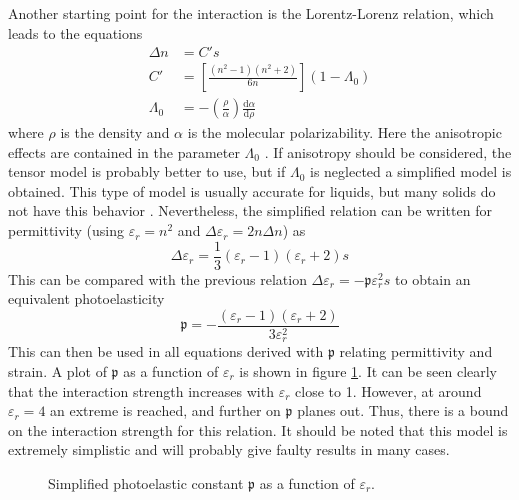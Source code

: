 \documentclass[10pt,a4paper]{eitExjobb}
\begin{document}
	Another starting point for the interaction is the Lorentz-Lorenz relation, which leads to the equations \cite{Korpel1988}
	\begin{align*}
	\Delta n &= C' s \\
	C' &= \left[ \frac{(n^2-1)(n^2+2)}{6n} \right](1-\Lambda_0) \\
	\Lambda_0 &= -\left( \frac{\rho}{\alpha} \right) \frac{\mathrm{d} \alpha}{\mathrm{d} \rho}
	\end{align*}
	where $\rho$ is the density and $\alpha$ is the molecular polarizability. Here the anisotropic effects are contained in the parameter $\Lambda_0$ \cite{Korpel1988}. If anisotropy should be considered, the tensor model is probably better to use, but if $\Lambda_0$ is neglected a simplified model is obtained. This type of model is usually accurate for liquids, but many solids do not have this behavior \cite{Korpel1988}. Nevertheless, the simplified relation can be written for permittivity (using $\varepsilon_r = n^2$ and $\Delta \varepsilon_r = 2n \Delta n$) as
	\begin{equation*}
	\Delta \varepsilon_r = \frac{1}{3} (\varepsilon_r - 1)(\varepsilon_r + 2) s
	\end{equation*}
	This can be compared with the previous relation $\Delta \varepsilon_r = -\mathfrak{p}\varepsilon_r^2 s$ to obtain an equivalent photoelasticity
	\begin{equation*}
	\mathfrak{p} = -\frac{(\varepsilon_r - 1)(\varepsilon_r + 2)}{3\varepsilon_r^2}
	\end{equation*}
	This can then be used in all equations derived with $\mathfrak{p}$ relating permittivity and strain. A plot of $\mathfrak{p}$ as a function of $\varepsilon_r$ is shown in figure \ref{fig:photoelastic-liquid}. It can be seen clearly that the interaction strength increases with $\varepsilon_r$ close to 1. However, at around $\varepsilon_r = 4$ an extreme is reached, and further on $\mathfrak{p}$ planes out. Thus, there is a bound on the interaction strength for this relation. It should be noted that this model is extremely simplistic and will probably give faulty results in many cases. 
	\begin{figure}[h]
		\centering
		
		\caption{\label{fig:photoelastic-liquid} Simplified photoelastic constant $\mathfrak{p}$ as a function of $\varepsilon_r$.}
	\end{figure}
	
	
\end{document}
